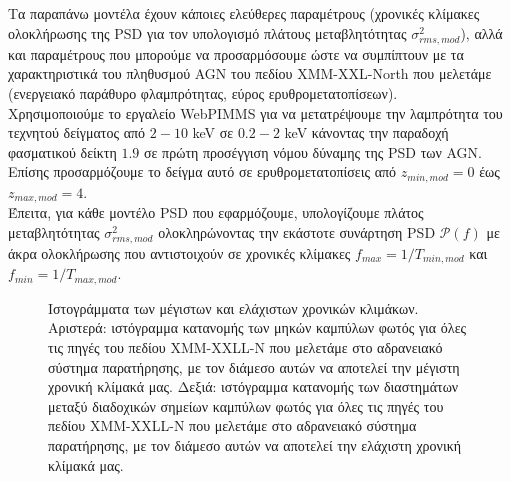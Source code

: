 Τα παραπάνω μοντέλα έχουν κάποιες ελεύθερες παραμέτρους (χρονικές κλίμακες ολοκλήρωσης της \textlatin{PSD} για τον υπολογισμό πλάτους μεταβλητότητας $\sigma_{rms, mod}^2$), αλλά και παραμέτρους που μπορούμε να προσαρμόσουμε ώστε να συμπίπτουν με τα χαρακτηριστικά του πληθυσμού \textlatin{AGN} του πεδίου \textlatin{XMM-XXL-North} που μελετάμε (ενεργειακό παράθυρο φλαμπρότητας, εύρος ερυθρομετατοπίσεων).\\ 
Χρησιμοποιούμε το εργαλείο \textlatin{WebPIMMS} για να μετατρέψουμε την λαμπρότητα του τεχνητού δείγματος από $2-10$ \textlatin{keV} σε $0.2-2$ \textlatin{keV} κάνοντας την παραδοχή φασματικού δείκτη $1.9$ σε πρώτη προσέγγιση νόμου δύναμης της \textlatin{PSD} των \textlatin{AGN}\cite{PIMMS}. Επίσης προσαρμόζουμε το δείγμα αυτό σε ερυθρομετατοπίσεις από $z_{min, mod}=0$ έως $z_{max, mod}=4$.\\
Έπειτα, για κάθε μοντέλο \textlatin{PSD} που εφαρμόζουμε, υπολογίζουμε πλάτος μεταβλητότητας $\sigma_{rms, mod}^2$ ολοκληρώνοντας την εκάστοτε συνάρτηση \textlatin{PSD} $\mathcal{P}(f)$ με άκρα ολοκλήρωσης που αντιστοιχούν σε χρονικές κλίμακες $f_{max} =1/Τ_{min, mod}$ και  $f_{min} =1/Τ_{max, mod}$.
\begin{figure}%
    \centering
    \qquad
     \caption{Ιστογράμματα των μέγιστων και ελάχιστων χρονικών κλιμάκων. Αριστερά: ιστόγραμμα κατανομής των μηκών καμπύλων φωτός για όλες τις πηγές του πεδίου \textlatin{XMM-XXLL-N} που μελετάμε στο αδρανειακό σύστημα παρατήρησης, με τον διάμεσο αυτών να αποτελεί την μέγιστη χρονική κλίμακά μας. Δεξιά: ιστόγραμμα κατανομής των διαστημάτων μεταξύ διαδοχικών σημείων καμπύλων φωτός για όλες τις πηγές του πεδίου \textlatin{XMM-XXLL-N} που μελετάμε στο αδρανειακό σύστημα παρατήρησης, με τον διάμεσο αυτών να αποτελεί την ελάχιστη χρονική κλίμακά μας.} \label{fig:MaxMInTime}
\end{figure}
 

